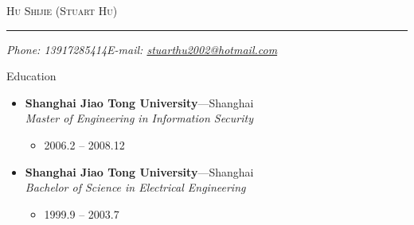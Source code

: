 \documentclass[11pt,oneside]{article}
\makeatletter
\newcommand{\name}{Hu Shijie (Stuart Hu)}
\newcommand{\phone}{Phone: 13917285414}
\newcommand{\email}{E-mail: \href{mailto:stuarthu2002@hotmail.com}{stuarthu2002@hotmail.com}}
\newcommand{\bigname}[1]{
	\begin{center}\selectfont\Huge\scshape#1\end{center}
}
\newenvironment{ressection}[1]{
	\vspace{4pt}
	{\selectfont\Large#1}
	\begin{itemize}
	\vspace{3pt}
}{
	\end{itemize}
}
\newcommand{\ressubitem}[1]{
	\vspace{-1pt}
	\item \begin{flushleft} #1 \end{flushleft}
}
\newcommand{\resbigitem}[3]{
	\vspace{-5pt}
	\item
	\textbf{#1}---#2 \\
	\textit{#3}
}
\newenvironment{ressubsec}[3]{
	\resbigitem{#1}{#2}{#3}
	\vspace{-2pt}
	\begin{itemize}
}{
    \end{itemize}
}
\makeatother
\begin{document}
\bigname{\name}

\vspace{-8pt} \rule{\textwidth}{1pt}

\vspace{-1pt} {\small\itshape \phone \hfill \email}

\vspace{8 pt}


\begin{ressection}{Education}

	\begin{ressubsec}{Shanghai Jiao Tong University}{Shanghai}{Master of Engineering in Information Security}
		\ressubitem{2006.2 -- 2008.12}
	\end{ressubsec}

	\begin{ressubsec}{Shanghai Jiao Tong University}{Shanghai}{Bachelor of Science in Electrical Engineering}
		\ressubitem{1999.9 -- 2003.7}
	\end{ressubsec}

\end{ressection}
\end{document}
